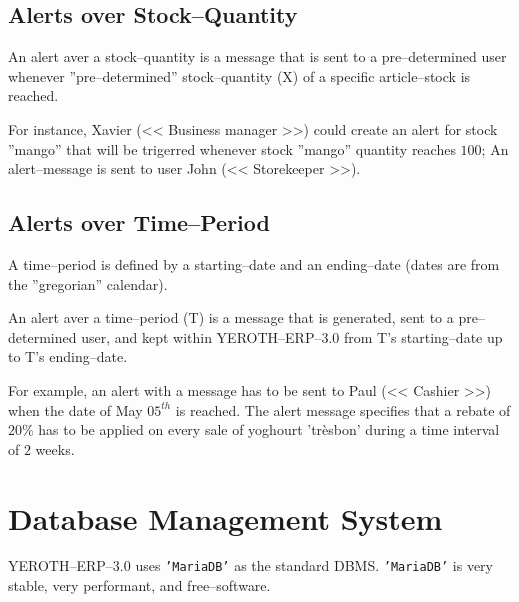 \documentclass[a4paper, 10pt]{article}
\newcommand{\yerotherpblack}{YEROTH--ERP--$3.0$\xspace}
\newcommand{\manager}{<< Business manager >>\xspace}
\newcommand{\storekeeper}{<< Storekeeper >>\xspace}
\newcommand{\cashier}{<< Cashier >>\xspace}
\newcommand{\mariadb}{\texttt{'MariaDB'}\xspace}
\begin{document}
\begin{multicols}{2}
\subsection{Alerts over Stock--Quantity}

An alert aver a stock--quantity is a message that
is sent to a pre--determined user whenever
''pre--determined'' stock--quantity (X) of
a specific article--stock is reached.

For instance, Xavier (\manager) could create
an alert for stock ''mango'' that will be
trigerred whenever stock ''mango'' quantity
reaches $100$; An alert--message is sent
to user John (\storekeeper).

\subsection{Alerts over Time--Period}

A time--period is defined by a
starting--date and an ending--date
(dates are from the ''gregorian'' calendar).

An alert aver a time--period (T) is a message
that is generated, sent to a pre--determined user,
and kept within \yerotherpblack from T's starting--date 
up to T's ending--date.

For example, an alert with a message has to be
sent to Paul (\cashier) when the date of May
$05^{th}$ is reached. The alert message
specifies that a rebate of $20\%$ has to be applied
on every sale of yoghourt 'tr\`esbon' during a
time interval of $2$ weeks.

\vspace{-1.0em}

\section{Database Management System}
\vspace{-0.3em}
\yerotherpblack uses \mariadb as the standard DBMS. 
\mariadb is very stable, very performant,
and free--software.

\vspace{-0.7em}


\end{multicols}
\end{document}
